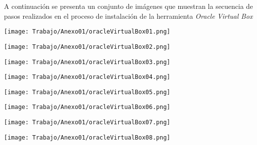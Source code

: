 A continuación se presenta un conjunto de imágenes que muestran la secuencia de pasos realizados en el proceso de instalación de la herramienta \textit{Oracle Virtual Box} \\

\begin{center}
		\texttt{[image: Trabajo/Anexo01/oracleVirtualBox01.png]}
		
		\texttt{[image: Trabajo/Anexo01/oracleVirtualBox02.png]}

		\texttt{[image: Trabajo/Anexo01/oracleVirtualBox03.png]}

		\texttt{[image: Trabajo/Anexo01/oracleVirtualBox04.png]}

		\texttt{[image: Trabajo/Anexo01/oracleVirtualBox05.png]}

		\texttt{[image: Trabajo/Anexo01/oracleVirtualBox06.png]}

		\texttt{[image: Trabajo/Anexo01/oracleVirtualBox07.png]}

		\texttt{[image: Trabajo/Anexo01/oracleVirtualBox08.png]}
\end{center}